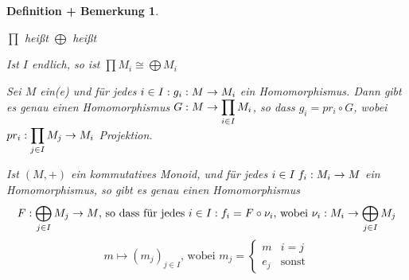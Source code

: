 \documentclass[a4paper,10pt,german]{scrbook}
\theoremstyle{saetze}
\theoremstyle{definitionen}
\newtheorem{DefBem}[Def]{Definition + Bemerkung}
\begin{document}
\begin{DefBem}
\mbox{}
\begin{enum}
\item $\prod$ heißt  \newline
$\bigoplus$ heißt 
\item Ist $I$ endlich, so ist $\prod M_i \cong \bigoplus M_i$
\item Sei $M$ ein(e) \bla und für jedes $i \in I: g_i:M \rightarrow
M_i$ ein Homomorphismus. Dann gibt es genau einen Homomorphismus
$\displaystyle G:M \rightarrow \prod_{i \in I} M_i$, so dass $g_i = pr_i
\circ G$, wobei $\displaystyle pr_i: \prod_{j \in I} M_j \rightarrow M_i$
Projektion.


\item Ist $(M,+)$ ein kommutatives Monoid, und für jedes $i \in I\; f_i:M_i
\rightarrow M$ ein Homomorphismus, so gibt es genau einen Homomorphismus \[
F: \bigoplus_{j\in I} M_j \rightarrow M \mbox{, so dass für jedes } i \in I: f_i = F
\circ \nu_i \mbox{, wobei } \nu_i:M_i \rightarrow \bigoplus_{j\in I} M_j\] \[m \mapsto
(m_j)_{j \in I}\mbox{, wobei } m_j = \left\{
\begin{array}{rl}
            m & i=j \\
            e_j & \mbox{sonst}
          \end{array}\right.\]




\end{enum}
\end{DefBem}
\end{document}
